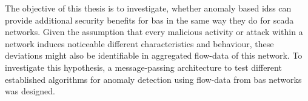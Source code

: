 
\begin{comment}
\begin{itemize}
	\item experiment
	\item test data captured from a floor section of the computer science building
	\item enriched with malicious packets to keep consistent
	
	\item (focusses only an purpose based) attack classes (cf. \parencite{Uma2013})
		\subitem \gls{dos}
			\subsubitem Short circuit -> blackout on entire line
			\subsubitem flooding of \code{A\_Restart} telegrams
			\subsubitem flooding nonsense
		\subitem replay
			\subsubitem repeating a time window
			\subsubitem sniff a tag and repeat it compressed??? \alert{whatever this means?}
			\subsubitem do inverse action
		\subitem manipulation/reconfiguration
			\subsubitem telegram manipulation
			\subsubitem reconfiguration of devices (Access Attack)
			\subsubitem reconfigure line couplers/make them useless (Access Attack)
		\subitem spoofing 
		\subitem Reconnaissance Attack
			\subsubitem network mapping
			
		\subitem 
	
	\item aim is to show if attacks can be identified by anomaly detection on flow data
		\subitem under the assumption, that attacks noticeable alter the characteristic and behaviour of \gls{knx} traffic
		\subitem cf. \parencite{Mukherjee1994,Yang2006,Pan2014}
	\item demonstrate a message-passing architecture to perform online analytics on \gls{knx} flow-data
	\item benchmark different algorithms against each other
\end{itemize}
\end{comment}

The objective of this thesis is to investigate, whether anomaly based \glspl{ids} can provide additional security benefits for \gls{bas} in the same way they do for \gls{scada} networks. %
Given the assumption that every malicious activity or attack within a network induces noticeable different characteristics and behaviour, these deviations might also be identifiable in aggregated flow-data of this network. \parencite[cf.][]{Mukherjee1994,Yang2006,Pan2014}
To investigate this hypothesis, a message-passing architecture to test different established algorithms for anomaly detection using flow-data from \gls{bas} networks was designed.


